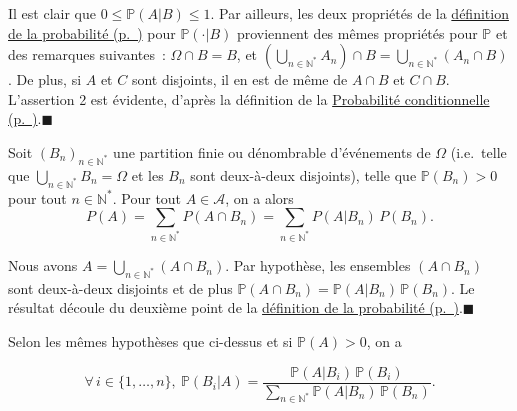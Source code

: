 \begin{preuve}
Il est clair que \(0 \leq \mathbb{P}(A|B) \leq 1\). Par ailleurs, les
deux propriétés de la \protect\hyperref[I-defproba]{définition de la
probabilité (p.~\pageref*{I-defproba})} pour \(\mathbb{P}(\cdot|B)\)
proviennent des mêmes propriétés pour \(\mathbb{P}\) et des remarques
suivantes~: \(\Omega \cap B = B\), et
\((\bigcup_{n\in\mathbb{N}^\ast} A_n ) \cap B = \bigcup_{n\in\mathbb{N}^\ast} (A_n \cap B)\).
De plus, si \(A\) et \(C\) sont disjoints, il en est de même de
\(A \cap B\) et \(C \cap B\). L'assertion 2 est évidente, d'après la
définition de la \protect\hyperref[I-defprobacond]{Probabilité
conditionnelle (p.~\pageref*{I-defprobacond})}.\hfill$\blacksquare$
\end{preuve}

\begin{proposition}\label{I-formprobatot}

Soit \((B_n)_{n\in\mathbb{N}^\ast}\) une partition finie ou dénombrable
d'événements de \(\Omega\) (i.e.~telle que
\(\bigcup_{n\in\mathbb{N}^\ast} B_n = \Omega\) et les \(B_n\) sont
deux-à-deux disjoints), telle que \(\mathbb{P}(B_n ) > 0\) pour tout
\(n\in\mathbb{N}^\ast\). Pour tout \(A \in \mathcal{A}\), on a alors
\begin{equation*}
P(A) = \sum_{n\in\mathbb{N}^\ast} P(A \cap B_n ) = \sum_{n\in\mathbb{N}^\ast} P(A|B_n)\, P(B_n).
\end{equation*}
\end{proposition}

\begin{preuve}
Nous avons \(A = \bigcup_{n\in\mathbb{N}^\ast} (A\cap B_n)\). Par
hypothèse, les ensembles \((A\cap B_n)\) sont deux-à-deux disjoints et
de plus \(\mathbb{P}(A\cap B_n) = \mathbb{P}(A|B_n)\,\mathbb{P}(B_n)\).
Le résultat découle du deuxième point de la
\protect\hyperref[I-defproba]{définition de la
probabilité (p.~\pageref*{I-defproba})}.\hfill$\blacksquare$
\end{preuve}

\begin{proposition}\label{I-bayes}

Selon les mêmes hypothèses que ci-dessus et si \(\mathbb{P}(A) > 0\), on
a

\begin{equation*}
\forall\, i \in \{1,\dots,n\},\  \mathbb{P}(B_i | A) = \dfrac{\mathbb{P}(A | B_i)\, \mathbb{P}(B_i)}{\sum_{n\in\mathbb{N}^\ast} \mathbb{P}(A | B_n)\, \mathbb{P}(B_n)}.
\end{equation*}
\end{proposition}

